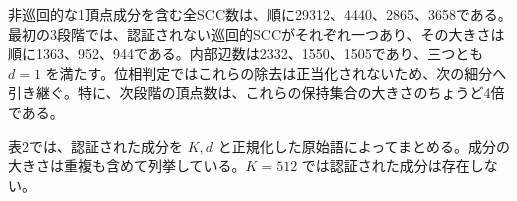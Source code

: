 \documentclass[11pt,reqno]{amsart}
\theoremstyle{definition}
\theoremstyle{definition}
\theoremstyle{remark}
\begin{document}
非巡回的な1頂点成分を含む全SCC数は、順に29312、4440、2865、3658である。最初の3段階では、認証されない巡回的SCCがそれぞれ一つあり、その大きさは順に1363、952、944である。内部辺数は2332、1550、1505であり、三つとも \(d=1\) を満たす。位相判定ではこれらの除去は正当化されないため、次の細分へ引き継ぐ。特に、次段階の頂点数は、これらの保持集合の大きさのちょうど4倍である。

表2では、認証された成分を \(K,d\) と正規化した原始語によってまとめる。成分の大きさは重複も含めて列挙している。\(K=512\) では認証された成分は存在しない。


\begingroup
\small
\setlength{\tabcolsep}{4pt}
\renewcommand{\arraystretch}{1.15}
\setlength{\LTcapwidth}{\textwidth}
\end{document}
